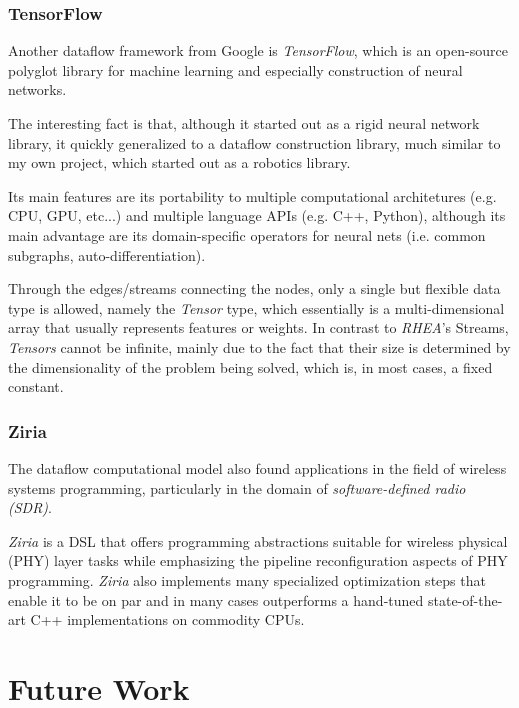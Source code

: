 \documentclass[sigplan,review,anonymous]{acmart}\settopmatter{printfolios=true}
\begin{document}
\subsubsection{TensorFlow}

Another dataflow framework from Google is \textit{TensorFlow}, which is an open-source polyglot library for machine learning and especially construction of neural networks.

The interesting fact is that, although it started out as a rigid neural network library, it quickly generalized to a dataflow construction library, much similar to my own project, which started out as a robotics library. 

Its main features are its portability to multiple computational architetures (e.g. CPU, GPU, etc...) and multiple language APIs (e.g. C++, Python), although its main advantage are its domain-specific operators for neural nets (i.e. common subgraphs, auto-differentiation).

Through the edges/streams connecting the nodes, only a single but flexible data type is allowed, namely the \textit{Tensor} type, which essentially is a multi-dimensional array that usually represents features or weights. In contrast to \textit{RHEA}'s Streams, \textit{Tensors} cannot be infinite, mainly due to the fact that their size is determined by the dimensionality of the problem being solved, which is, in most cases, a fixed constant.

\subsubsection{Ziria}

The dataflow computational model also found applications in the field of wireless systems programming, particularly in the domain of \textit{software-defined radio (SDR)}. 

\textit{Ziria}\cite{ziria} is a DSL that offers programming abstractions suitable for wireless physical (PHY) layer tasks while emphasizing the pipeline reconfiguration aspects of PHY programming. \textit{Ziria} also implements many specialized optimization steps that enable it to be on par and in many cases outperforms a hand-tuned state-of-the-art C++ implementations on commodity CPUs.

\section{Future Work}
\end{document}
